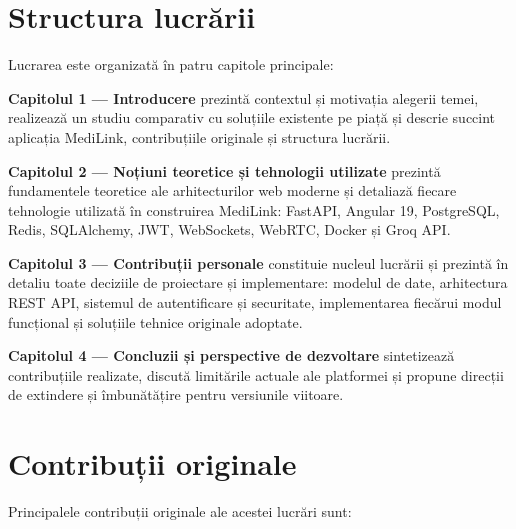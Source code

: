 \section{Structura lucrării}

Lucrarea este organizată în patru capitole principale:

\textbf{Capitolul 1 — Introducere} prezintă contextul și motivația alegerii temei, realizează un studiu comparativ cu soluțiile existente pe piață și descrie succint aplicația MediLink, contribuțiile originale și structura lucrării.

\textbf{Capitolul 2 — Noțiuni teoretice și tehnologii utilizate} prezintă fundamentele teoretice ale arhitecturilor web moderne și detaliază fiecare tehnologie utilizată în construirea MediLink: FastAPI, Angular 19, PostgreSQL, Redis, SQLAlchemy, JWT, WebSockets, WebRTC, Docker și Groq API.

\textbf{Capitolul 3 — Contribuții personale} constituie nucleul lucrării și prezintă în detaliu toate deciziile de proiectare și implementare: modelul de date, arhitectura REST API, sistemul de autentificare și securitate, implementarea fiecărui modul funcțional și soluțiile tehnice originale adoptate.

\textbf{Capitolul 4 — Concluzii și perspective de dezvoltare} sintetizează contribuțiile realizate, discută limitările actuale ale platformei și propune direcții de extindere și îmbunătățire pentru versiunile viitoare.

\section{Contribuții originale}

Principalele contribuții originale ale acestei lucrări sunt:

